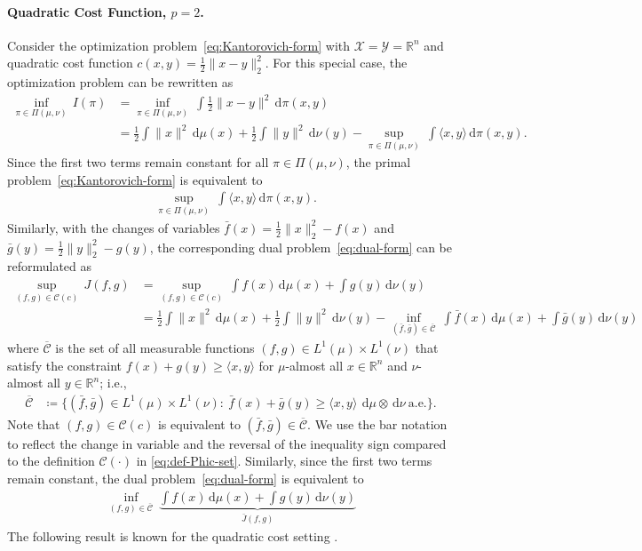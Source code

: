 \documentclass[10pt]{article}
\newcommand{\ud}{\,\mathrm{d}}
\newcommand{\norm}[1]{\|#1\|}
\newcommand{\real}{\mathbb{R}}
\newcommand{\calC}{\mathcal{C}}
\newcommand{\calX}{\mathcal{X}}
\newcommand{\calY}{\mathcal{Y}}
\numberwithin{equation}{section}
\begin{document}
\paragraph{Quadratic Cost Function, $p=2$.}\label{sec:quadratic-cost}
Consider the optimization problem~\eqref{eq:Kantorovich-form} with $\calX = \calY=\real^n$ and quadratic cost function $c(x,y)=\frac{1}{2}\norm{x-y}_2^2$. For this special case, the optimization problem can be rewritten as
\begin{align}
\inf_{\pi\in\Pi(\mu,\nu)}\, I(\pi)
&= \inf_{\pi \in \Pi(\mu,\nu)}~\int \frac{1}{2}\norm{x-y}^2 \ud \pi(x,y) \nonumber\\
&= \frac{1}{2}\int \norm{x}^2 \ud \mu(x)
+ \frac{1}{2}\int \norm{y}^2 \ud \nu(y)
- \sup_{\pi\in\Pi(\mu,\nu)}~\int \langle x,y\rangle \ud \pi(x,y) . \label{eq:primal-quad-transform}
\end{align}
Since the first two terms remain constant for all $\pi\in \Pi(\mu,\nu)$, the primal problem~\eqref{eq:Kantorovich-form} is equivalent to
\begin{align}
&\sup_{\pi\in\Pi(\mu,\nu)}~\int \langle x,y\rangle \ud \pi(x,y) .
\label{eq:primal-form-quadratic}
\end{align}
Similarly, with the changes of variables $\bar{f}(x) = \frac{1}{2}\norm{x}_2^2-f(x)$ and $\bar{g}(y) = \frac{1}{2}\norm{y}_2^2-g(y)$, the corresponding dual problem~\eqref{eq:dual-form} can be reformulated as
\begin{align}
\sup_{(f,g)\in\calC(c)}\, J(f,g)
&= \sup_{(f,g)\in\calC(c)}~\int f(x)\ud \mu(x) + \int g(y)\ud \nu(y) \nonumber\\
&= \frac{1}{2}\int \norm{x}^2 \ud \mu(x)
+ \frac{1}{2}\int \norm{y}^2 \ud \nu(y) 
- \inf_{(\bar{f},\bar{g}) \in \overline{\calC} }~\int \bar{f}(x)\ud \mu(x) + \int \bar{g}(y)\ud \nu(y)
\nonumber%
\end{align}
where $\overline{\calC}$ is the set of all measurable functions $(f,g) \in L^1(\mu) \times L^1(\nu)$ that satisfy the constraint $f(x) + g(y) \geq \langle x, y\rangle$ for $\mu$-almost all $x \in \real^n$ and $\nu$-almost all $y\in \real^n$; i.e., 
\begin{align*}%
\overline{\calC} &\coloneqq \bigl\{(\bar{f},\bar{g})\in L^1(\mu)\times L^1(\nu):~\bar{f}(x)+\bar{g}(y)\geq \langle x, y\rangle~\ud \mu \otimes \ud \nu~\text{a.e.}\bigr\}.
\end{align*} 
Note that $(f,g)\in\calC(c)$ is equivalent to $(\bar{f},\bar{g})\in\overline{\calC}$. 
We use the bar notation to reflect the change in variable and the reversal of the inequality sign compared to the definition $\calC(\cdot)$ in \eqref{eq:def-Phic-set}. 
%
Similarly, since the first two terms remain constant, the dual problem~\eqref{eq:dual-form} is equivalent to
\begin{align}
\inf_{(f,g) \in \overline{\calC} }~\underbrace{\int f(x)\ud \mu(x) + \int g(y)\ud \nu(y)}_{\bar{J}(f,g)}
\label{eq:dual-form-quadratic}
\end{align}
The following result is known for the quadratic cost setting \cite[Theorems 2.9~and 2.12]{villani2003topics}.
\end{document}
